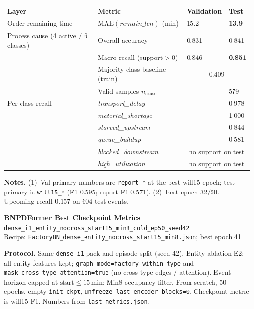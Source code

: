 \documentclass[10pt,a4paper]{article}
\begin{document}
\begin{center}
\begin{tabular}{l l l l}
\toprule
Layer & Metric & Validation & Test \\
\midrule
Order remaining time
  & $\mathrm{MAE}(\textit{remain\_len})$ (min)
  & 15.2
  & \textbf{13.9} \\
\midrule
Process cause (4 active / 6 classes)
  & Overall accuracy
  & 0.831
  & 0.841 \\
  & Macro recall (support${>}0$)
  & 0.846
  & \textbf{0.851} \\
  & Majority-class baseline (train)
  & \multicolumn{2}{c}{0.409} \\
  & Valid samples $n_{\mathrm{cause}}$
  & ---
  & 579 \\
\midrule
Per-class recall
  & \textit{transport\_delay}
  & --- & 0.978 \\
  & \textit{material\_shortage}
  & --- & 1.000 \\
  & \textit{starved\_upstream}
  & --- & 0.844 \\
  & \textit{queue\_buildup}
  & --- & 0.581 \\
  & \textit{blocked\_downstream}
  & \multicolumn{2}{c}{no support on test} \\
  & \textit{high\_utilization}
  & \multicolumn{2}{c}{no support on test} \\
\bottomrule
\end{tabular}
\end{center}

\small
\textbf{Notes.}
(1)~Val primary numbers are \texttt{report\_*} at the best will15 epoch; test primary is \texttt{will15\_*} (F1 0.595; report F1 0.571).
(2)~Best epoch 32/50. Upcoming recall 0.157 on 604 test events.

\clearpage
\begin{center}
{\LARGE\bfseries BNPDFormer Best Checkpoint Metrics}\\[3pt]
{\large\texttt{dense\_i1\_entity\_nocross\_start15\_min8\_cold\_ep50\_seed42}}\\[2pt]
{\normalsize Recipe: \texttt{FactoryBN\_dense\_entity\_nocross\_start15\_min8.json}; best epoch 41}
\end{center}

\textbf{Protocol.}
Same \texttt{dense\_i1} pack and episode split (seed 42).
Entity ablation E2: all entity features kept; \texttt{graph\_mode=factory\_within\_type} and \texttt{mask\_cross\_type\_attention=true} (no cross-type edges / attention).
Event horizon capped at $\mathrm{start}\le 15$\,min; Min8 occupancy filter.
From-scratch, 50 epochs, empty \texttt{init\_ckpt}, \texttt{unfreeze\_last\_encoder\_blocks=0}.
Checkpoint metric is will15 F1.
Numbers from \texttt{last\_metrics.json}.
\end{document}
